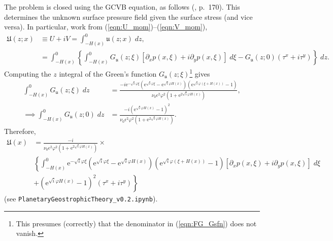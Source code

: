\documentclass[10pt]{amsart}
\begin{document}
The problem is closed using the GCVB equation, as follows (\citealt{salmon98}, p.~170).
This determines the unknown surface pressure field given the surface stress (and vice versa).
In particular, work from (\ref{eqn:U_mom})--(\ref{eqn:V_mom}),
\begin{align}
\mathfrak{U} (z;x) & \equiv U + i V = \int_{-H(x)}^{0} \mathfrak{u} (z;x) \; dz , \label{eqn:depth_integrated_flow_def} \\
& = \int_{-H(x)}^0 \left\{ \int_{-H(x)}^{0} G_{ \mathfrak{u}} (z; \xi) \left[ \partial_x p( x, \xi) + i \partial_y p( x, \xi) \right] \; d \xi 
-  G_{\mathfrak{u}} (z; 0)  \left( \tau^x + i \tau^y \right)  \right\} \; dz.
\end{align}
Computing the $z$ integral of the Green's function $G_{\mathfrak{u}} (z; \xi)$\footnote{This presumes (correctly) that the denominator in (\ref{eqn:FG_Gsfn}) does not vanish.} gives 
\begin{align}
\int_{-H(x)}^0 G_{ \mathfrak{u}}(z;\xi) \; dz & = 
\frac{- i \mathrm{e}^{-\sqrt{i} \varphi \xi} 
\left(
\mathrm{e}^{\sqrt{i} \varphi \xi} - 
\mathrm{e}^{\sqrt{i} \varphi H(x)} 
\right) \left(
\mathrm{e}^{\sqrt{i} \varphi  \left( \xi + H(x) \right)} - 1
\right)
} { \nu_0 \epsilon^2 \varphi^2  \left(1 + \mathrm{e}^{2 \sqrt{i} \varphi H(x )} \right)} , \nonumber \\
\implies \int_{-H(x)}^0 G_{ \mathfrak{u}}(z;0) \; dz & = 
\frac{ - i \left( 
\mathrm{e}^{\sqrt{i} \varphi  H(x) }   - 1   
\right)^2
} { \nu_0 \epsilon^2 \varphi^2  \left(1 + \mathrm{e}^{2 \sqrt{i} \varphi H(x )} \right)} .
\end{align}
Therefore,
\begin{align}
\mathfrak{U} (x) & = 
\frac{-i }{{ \nu_0 \epsilon^2 \varphi^2  \left(1 + \mathrm{e}^{2 \sqrt{i} \varphi H(x )} \right)} } \times \nonumber \\
&\left\{
 \int_{-H(x)}^{0} 
\mathrm{e}^{-\sqrt{i} \varphi \xi} 
\left(
\mathrm{e}^{\sqrt{i} \varphi \xi} - 
\mathrm{e}^{\sqrt{i} \varphi H(x)} 
\right) \left(
\mathrm{e}^{\sqrt{i} \varphi  \left( \xi + H(x) \right)} - 1
\right)
 \left[ \partial_x p( x, \xi) + i \partial_y p( x, \xi) \right] \; d \xi  \right. \nonumber  \\
& + \left.
\left( 
\mathrm{e}^{\sqrt{i} \varphi  H(x) }   - 1   
\right)^2
\left( \tau^x + i \tau^y \right)   \right\}
\label{eqn:UV_expression}
\end{align}
(see \texttt{PlanetaryGeostrophicTheory\_v0.2.ipynb}).
\end{document}
